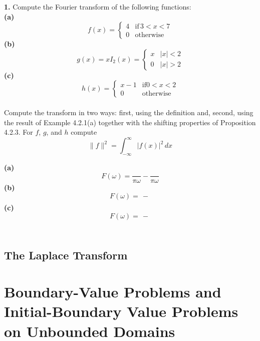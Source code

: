 \documentclass{amsbook}%
\theoremstyle{plain}
\numberwithin{equation}{section}
\begin{document}
		\noindent\textbf{1.} Compute the Fourier transform of the following functions:\\
		\textbf{(a)}
		\begin{equation*}
			f(x)=
			\begin{cases}
				4 & \mathrm{if}\,3<x<7\\
				0 & \mathrm{otherwise}
			\end{cases}
		\end{equation*}
		\textbf{(b)}
		\begin{equation*}
			g(x)=xI_2(x)=
			\begin{cases}
				x & |x|<2\\
				0 & |x|>2
			\end{cases}
		\end{equation*}
		\textbf{(c)}
		\begin{equation*}
			h(x)=
			\begin{cases}
				x-1 & \mathrm{if} 0<x<2\\
				0 & \mathrm{otherwise}
			\end{cases}
		\end{equation*}
		\\[12pt]		
		Compute the transform in two ways: first, using the definition and, second, using the result of Example 4.2.1(a) together with the shifting properties of Proposition 4.2.3. For $f$, $g$, and $h$ compute
		\begin{equation*}
			\|f\|^2=\int_{-\infty}^\infty{|f(x)|^2\,dx}
		\end{equation*}
		
		\textbf{(a)}
		\begin{equation*}
			F(\omega)=\frac{}{\pi\omega}-\frac{}{\pi\omega}
		\end{equation*}
		\textbf{(b)}
		\begin{equation*}
			F(\omega)=\frac{}{}-\frac{}{}
		\end{equation*}
		\textbf{(c)}
		\begin{equation*}
			F(\omega)=\frac{}{}-\frac{}{}
		\end{equation*}
		\\[12pt]			
	
	\section{The Laplace Transform}

\chapter{Boundary-Value Problems and Initial-Boundary Value Problems on Unbounded Domains}
\end{document}
